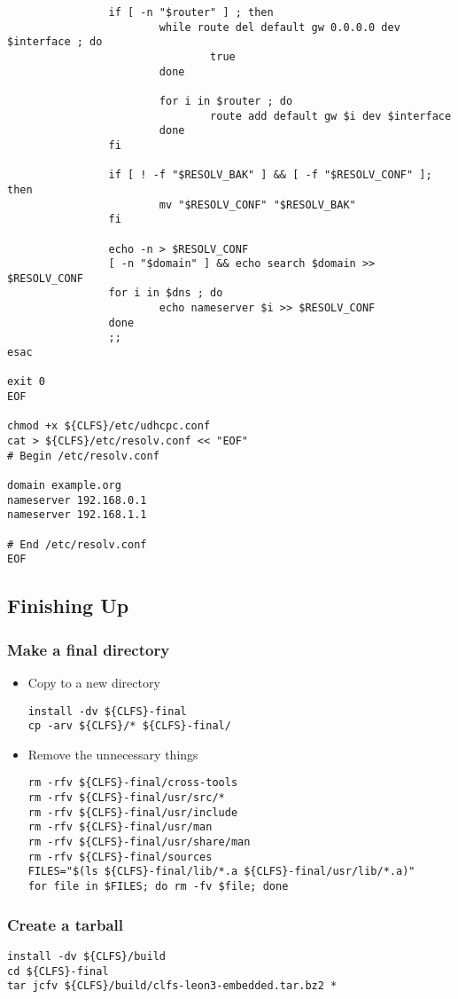 \begin{lstlisting}
                if [ -n "$router" ] ; then
                        while route del default gw 0.0.0.0 dev $interface ; do
                                true
                        done

                        for i in $router ; do
                                route add default gw $i dev $interface
                        done
                fi

                if [ ! -f "$RESOLV_BAK" ] && [ -f "$RESOLV_CONF" ]; then
                        mv "$RESOLV_CONF" "$RESOLV_BAK"
                fi

                echo -n > $RESOLV_CONF
                [ -n "$domain" ] && echo search $domain >> $RESOLV_CONF
                for i in $dns ; do
                        echo nameserver $i >> $RESOLV_CONF
                done
                ;;
esac

exit 0
EOF

chmod +x ${CLFS}/etc/udhcpc.conf
cat > ${CLFS}/etc/resolv.conf << "EOF"
# Begin /etc/resolv.conf

domain example.org
nameserver 192.168.0.1
nameserver 192.168.1.1

# End /etc/resolv.conf
EOF
\end{lstlisting}
\subsection{Finishing Up}
 \subsubsection{Make a final directory}
  \begin{itemize}
  \item Copy to a new directory
\begin{lstlisting}
install -dv ${CLFS}-final
cp -arv ${CLFS}/* ${CLFS}-final/
\end{lstlisting}
  \item Remove the unnecessary things
\begin{lstlisting}
rm -rfv ${CLFS}-final/cross-tools
rm -rfv ${CLFS}-final/usr/src/*
rm -rfv ${CLFS}-final/usr/include
rm -rfv ${CLFS}-final/usr/man
rm -rfv ${CLFS}-final/usr/share/man
rm -rfv ${CLFS}-final/sources
FILES="$(ls ${CLFS}-final/lib/*.a ${CLFS}-final/usr/lib/*.a)"
for file in $FILES; do rm -fv $file; done
\end{lstlisting}
 \end{itemize}
 \subsubsection{Create a tarball}
\begin{lstlisting}
install -dv ${CLFS}/build
cd ${CLFS}-final
tar jcfv ${CLFS}/build/clfs-leon3-embedded.tar.bz2 *
\end{lstlisting}

